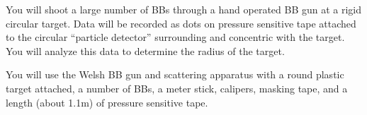 \documentclass[11pt]{article}
\begin{document}
\vspace{5mm}


You will shoot a large number of BBs through a hand operated BB gun at a rigid
circular target. Data will be recorded as dots on pressure sensitive tape
attached to the circular ``particle detector'' surrounding and concentric with the
target. You will analyze this data to determine the radius of the target.

You will use the Welsh BB gun and scattering apparatus with a round plastic
target attached, a number of BBs, a meter stick, calipers, masking tape, and a
length (about 1.1m) of pressure sensitive tape.

\vspace{5mm}

\end{document}
